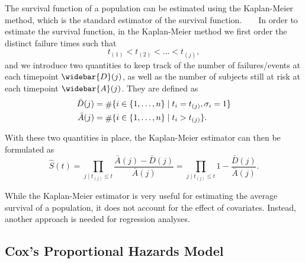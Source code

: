 The survival function of a population
can be estimated using the Kaplan-Meier method,
which is the standard estimator of the survival function.
~\autocite{kaplan1958nonparametric}
~\autocite{kleinSurvival2003}
In order to estimate the survival function, 
in the Kaplan-Meier method we first order
the distinct failure times such that%
\begin{equation*}
    t_{(1)} < t_{(2)} < \ldots < t_{(j)},
\end{equation*}
%
and we introduce two quantities to keep track of
the number of failures/events at each timepoint \(\widebar{D}(j)\), 
as well as the number of subjects still at risk at each timepoint \(\widebar{A}(j)\).
They are defined as
\begin{equation}
\begin{aligned}
    \bar{D}(j) &= \card \{i \in \{1, \dots, n\} \mid t_i = t_{(j)}, \sigma_i = 1\} \\
    \bar{A}(j) &= \card \{i \in \{1, \dots, n\} \mid t_i > t_{(j)}\}.
\end{aligned}
\end{equation}

With these two quantities in place, 
the Kaplan-Meier estimator can then be formulated as 
%
\begin{equation}
    \widehat{S}(t)
    =   \prod_{j \mid t_{(j)} \leq t} 
        \frac{
            \bar{A}(j) -
            \bar{D}(j)
        }{
            \bar{A}(j)
        }
    =   \prod_{j \mid t_{(j)} \leq t} 
        1 - \frac{
            \bar{D}(j)
        }{
            \bar{A}(j)
        }.
\end{equation}

While the Kaplan-Meier estimator is very useful 
for estimating the average survival of a population, 
it does not account for the effect of covariates.
Instead, another approach is needed for regression analyses.

\subsection{Cox's Proportional Hazards Model}

